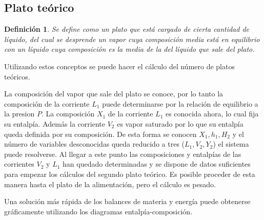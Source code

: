 \documentclass[11pt,openany]{book}
\newtheorem{defi}{Definición}
\begin{document}
\subsection{Plato teórico}
\begin{defi}
Se define como un plato que está cargado de cierta cantidad de líquido, del cual se desprende 
un vapor cuya composición media está en equilibrio con un líquido cuya composición es la media de 
la del líquido que sale del plato.
\end{defi}
Utilizando estos conceptos se puede hacer el cálculo del número de platos teóricos.

La composición del vapor que sale del plato se conoce, por lo tanto la composición de la corriente 
$L_1$ puede determinarse por la relación de equilibrio a la presion $P$. La composición $X_1$ de la corriente 
$L_1$ es conocida ahora, lo cual fija su entalpía. Además la corriente $V_2$ es vapor saturado por lo que 
su entalpía queda definida por su composición. De esta forma se conocen $X_1, h_1, H_2$ y el número 
de variables desconocidas queda reducido a tres ($L_1,V_2,Y_2$) el sistema puede resolverse. Al llegar a
este punto las composiciones y entalpías de las corrientes $V_2$ y $L_1$ han quedado determinadas y se 
dispone de datos suficientes para empezar los cálculos del segundo plato teórico. Es posible 
proceder de esta manera hasta el plato de la alimentación, pero el cálculo es pesado.

Una solución más rápida de los balances de materia y energía puede obtenerse gráficamente 
utilizando los diagramas entalpía-composición.
\end{document}
